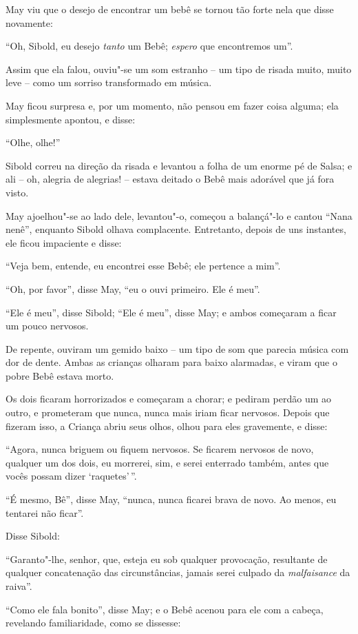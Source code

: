 May viu que o desejo de encontrar um bebê se tornou tão forte nela que
disse novamente:

``Oh, Sibold, eu desejo \emph{tanto} um Bebê; \emph{espero} que
encontremos um''.

Assim que ela falou, ouviu"-se um som estranho -- um tipo de risada
muito, muito leve -- como um sorriso transformado em música.

May ficou surpresa e, por um momento, não pensou em fazer coisa alguma;
ela simplesmente apontou, e disse:

``Olhe, olhe!''

Sibold correu na direção da risada e levantou a folha de um enorme pé de
Salsa; e ali -- oh, alegria de alegrias! -- estava deitado o Bebê mais
adorável que já fora visto.

May ajoelhou"-se ao lado dele, levantou"-o, começou a balançá"-lo e cantou
``Nana nenê'', enquanto Sibold olhava complacente. Entretanto, depois de
uns instantes, ele ficou impaciente e disse:

``Veja bem, entende, eu encontrei esse Bebê; ele pertence a mim''.

``Oh, por favor'', disse May, ``eu o ouvi primeiro. Ele é meu''.

``Ele é meu'', disse Sibold; ``Ele é meu'', disse May; e ambos começaram
a ficar um pouco nervosos.

De repente, ouviram um gemido baixo -- um tipo de som que parecia música
com dor de dente. Ambas as crianças olharam para baixo alarmadas, e
viram que o pobre Bebê estava morto.

Os dois ficaram horrorizados e começaram a chorar; e pediram perdão um
ao outro, e prometeram que nunca, nunca mais iriam ficar nervosos.
Depois que fizeram isso, a Criança abriu seus olhos, olhou para eles
gravemente, e disse:

``Agora, nunca briguem ou fiquem nervosos. Se ficarem nervosos de novo,
qualquer um dos dois, eu morrerei, sim, e serei enterrado também, antes
que vocês possam dizer `raquetes'\,''.

``É mesmo, Bê'', disse May, ``nunca, nunca ficarei brava de novo. Ao
menos, eu tentarei não ficar''.

Disse Sibold:

``Garanto"-lhe, senhor, que, esteja eu sob qualquer provocação,
resultante de qualquer concatenação das circunstâncias, jamais serei
culpado da \emph{malfaisance} da raiva''.

``Como ele fala bonito'', disse May; e o Bebê acenou para ele com a
cabeça, revelando familiaridade, como se dissesse:

